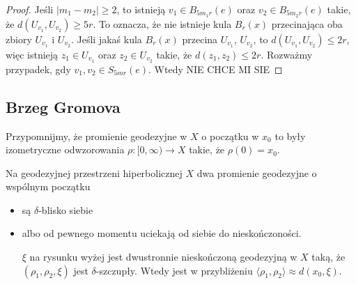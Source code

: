 \begin{proof}
  Jeśli $|m_1-m_2|\geq 2$, to istnieją $v_1\in B_{5m_1r}(e)$ oraz $v_2\in B_{5m_2r}(e)$ takie, że $d(U_{v_1}, U_{v_2})\geq 5r$. To oznacza, że nie istnieje kula $B_r(x)$ przecinająca oba zbiory $U_{v_1}$ i $U_{v_2}$. Jeśli jakaś kula $B_r(x)$ przecina $U_{v_1}$, $U_{v_2}$, to $d(U_{v_1}, U_{v_2})\leq 2r$, więc istnieją $z_1\in U_{v_1}$ oraz $z_2\in U_{v_2}$ takie, że $d(z_1,z_2)\leq 2r$. Rozważmy przypadek, gdy $v_1,v_2\in S_{5mr}(e)$. Wtedy 
  {\large\color{red}NIE CHCE MI SIE}


\end{proof}

\subsection{Brzeg Gromova}

Przypomnijmy, że promienie geodezyjne w $X$ o początku w $x_0$ to były izometryczne odwzorowania $\rho:[0,\infty)\to X$ takie, że $\rho(0)=x_0$.

Na geodezyjnej przestrzeni hiperbolicznej $X$ dwa promienie geodezyjne o wspólnym początku
\begin{itemize}
  \item są $\delta$-blisko siebie
    \begin{center}
    \end{center}
  \item albo od pewnego momentu uciekają od siebie do nieskończoności.
    \begin{center}
    \end{center}
    $\xi$ na rysunku wyżej jest dwustronnie nieskończoną geodezyjną w $X$ taką, że $(\rho_1, \rho_2, \xi)$ jest $\delta$-szczupły. Wtedy  jest w przybliżeniu $\langle \rho_1, \rho_2\rangle\approx d(x_0,\xi)$.
\end{itemize}

